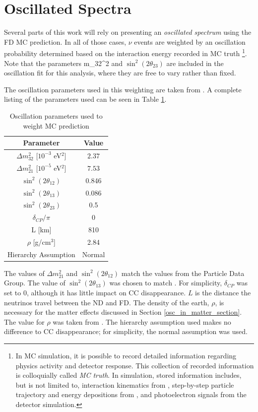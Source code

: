 \section{Oscillated Spectra}
\label{osc_weight_section}

Several parts of this work will rely on presenting an
\textit{oscillated spectrum} using the FD MC prediction.
In all of those cases, $\nu$ events are weighted by an oscillation
probability determined based on the interaction energy recorded in MC truth
\footnote{In MC simulation, it is possible to record detailed information
regarding physics activity and detector response.  This collection
of recorded information is colloquially called \textit{MC truth}.
In \nova simulation, stored information includes, but is not limited to,
interaction kinematics from \genie, step-by-step particle trajectory and energy
depositions from \geant, and photoelectron signals from the detector
simulation.}.
Note that the parameters \Delta m_{32}^{2} and $\sin^2(2\theta_{23})$
are included in the oscillation fit for this analysis,
where they are free to vary rather than fixed.

The oscillation parameters used in this weighting are taken from
\cite{pdg, nova2016nue,nova2016numu, bassin2000crust}.
A complete listing of the parameters used can be seen in Table
\ref{osc_par_table}.



\begin{table}
\begin{center}
\begin{tabular}{|c|c|}
\hline
\textbf{Parameter} & \textbf{Value}\tabularnewline
\hline
\hline
$\Delta m_{32}^{2}$ [$10^{-3}$ eV$^2$] & $2.37$ \tabularnewline
\hline
$\Delta m_{21}^{2}$ [$10^{-5}$ eV$^2$] & $7.53$ \tabularnewline
\hline
$\sin^2(2\theta_{12})$ & 0.846 \tabularnewline
\hline
$\sin^2(2\theta_{13})$ & 0.086 \tabularnewline
\hline
$\sin^2(2\theta_{23})$ & 0.5 \tabularnewline
\hline
$\delta_{CP} / \pi$ & 0 \tabularnewline
\hline
L [km] & 810 \tabularnewline
\hline
$\rho$ [g/cm$^3$] & 2.84 \tabularnewline
\hline
Hierarchy Assumption& Normal \tabularnewline
\hline
\end{tabular}
\end{center}
\caption{Oscillation parameters used to weight MC prediction}
{
The values of $\Delta m_{21}^{2}$ and $\sin^2(2\theta_{12})$ match the values
from the Particle Data Group. The value of $\sin^2(2\theta_{13})$
was chosen to match \cite{nova2016nue}.
For simplicity, $\delta_{CP}$ was set to 0, although it has little impact on
\numu CC disappearance.
$L$ is the distance the neutrinos travel between the ND and FD.
The density of the earth, $\rho$, is necessary for the matter effects
discussed in Section \ref{osc_in_matter_section}.
The value for $\rho$ was taken from \cite{bassin2000crust}.
The hierarchy assumption used makes no difference to \numu CC disappearance;
for simplicity, the normal assumption was used.
}
\label{osc_par_table}
\end{table}


